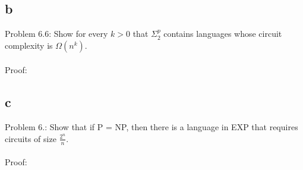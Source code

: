 \documentclass[letterpaper,notitlepage,twoside]{article}
\begin{document}
\subsection*{b}
Problem 6.6: Show for every $k > 0$ that $\Sigma_2^p$ contains languages whose circuit complexity is $\Omega\left(n^k\right)$.
\\\\
Proof:
\\


\subsection*{c}
Problem 6.: Show that if P = NP, then there is a language in EXP that requires circuits of size $\frac{2^n}{n}$.
\\\\
Proof:
\\
\end{document}

